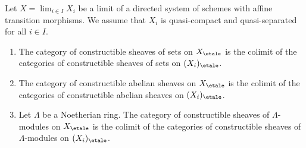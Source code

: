 \begin{lemma}
\label{lemma-category-is-colimit}
Let $X = \lim_{i \in I} X_i$ be a limit of a directed
system of schemes with affine transition morphisms.
We assume that $X_i$ is quasi-compact and quasi-separated
for all $i \in I$.
\begin{enumerate}
\item The category of constructible sheaves of sets on $X_\etale$
is the colimit of the categories of constructible sheaves of sets
on $(X_i)_\etale$.
\item The category of constructible abelian sheaves on $X_\etale$
is the colimit of the categories of constructible abelian sheaves
on $(X_i)_\etale$.
\item Let $\Lambda$ be a Noetherian ring. The category of constructible
sheaves of $\Lambda$-modules on $X_\etale$ is the colimit of the
categories of constructible sheaves of $\Lambda$-modules on $(X_i)_\etale$.
\end{enumerate}
\end{lemma}

